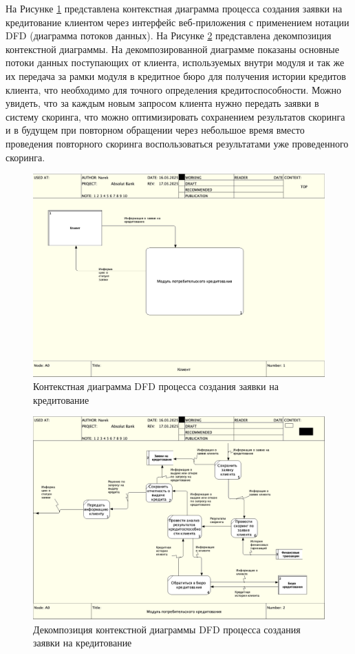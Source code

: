 \documentclass[14pt, a4paper]{extarticle}
\begin{document}
На Рисунке \ref{fig:dfd0} представлена контекстная диаграмма
процесса создания заявки на кредитование клиентом через интерфейс
веб-приложения с применением нотации DFD (диаграмма потоков данных). На
Рисунке \ref{fig:dfd1} представлена декомпозиция контекстной диаграммы. На
декомпозированной диаграмме показаны основные потоки данных поступающих от
клиента, используемых внутри модуля и так же их передача за рамки модуля в
кредитное бюро для получения истории кредитов клиента, что необходимо для
точного определения кредитоспособности. Можно увидеть, что за каждым новым
запросом клиента нужно передать заявки в систему скоринга, что можно
оптимизировать сохранением результатов скоринга и в будущем при повторном
обращении через небольшое время вместо проведения повторного скоринга
воспользоваться результатами уже проведенного скоринга.

\begin{figure}[H]
	\centering
	\includegraphics[scale=0.33]{dfd0}
	\caption{Контекстная диаграмма DFD процесса создания заявки на кредитование}
	\label{fig:dfd0}
\end{figure}

\begin{figure}[H]
	\centering
	\includegraphics[scale=0.33]{dfd1}
	\caption{Декомпозиция контекстной диаграммы DFD процесса создания заявки на
кредитование}
	\label{fig:dfd1}
\end{figure}
\end{document}
